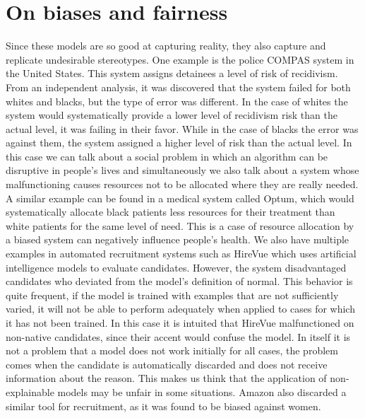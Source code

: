 \documentclass[
twocolumn,
]{ceurart}
\begin{document}
\section{On biases and fairness}
Since these models are so good at capturing reality, they also capture and replicate undesirable stereotypes. One example is the police COMPAS system in the United States. This system assigns detainees a level of risk of recidivism. From an independent analysis, it was discovered that the system failed for both whites and blacks\cite{juliaangwin_2016}, but the type of error was different. In the case of whites the system would systematically provide a lower level of recidivism risk than the actual level, it was failing in their favor. While in the case of blacks the error was against them, the system assigned a higher level of risk than the actual level. In this case we can talk about a social problem in which an algorithm can be disruptive in people's lives and simultaneously we also talk about a system whose malfunctioning causes resources not to be allocated where they are really needed\cite{berkeley_obermeyer_berkeley_chicago_mullainathan_chicago_metrics_2019}. A similar example can be found in a medical system called Optum, which would systematically allocate black patients less resources for their treatment than white patients for the same level of need. This is a case of resource allocation by a biased system can negatively influence people's health. We also have multiple examples in automated recruitment systems such as HireVue\cite{harwell_2019} which uses artificial intelligence models to evaluate candidates. However, the system disadvantaged candidates who deviated from the model's definition of normal. This behavior is quite frequent, if the model is trained with examples that are not sufficiently varied, it will not be able to perform adequately when applied to cases for which it has not been trained. In this case it is intuited that HireVue malfunctioned on non-native candidates, since their accent would confuse the model. In itself it is not a problem that a model does not work initially for all cases, the problem comes when the candidate is automatically discarded and does not receive information about the reason. This makes us think that the application of non-explainable models may be unfair in some situations. Amazon also discarded\cite{dastin_2018} a similar tool for recruitment, as it was found to be biased against women. 
\end{document}
